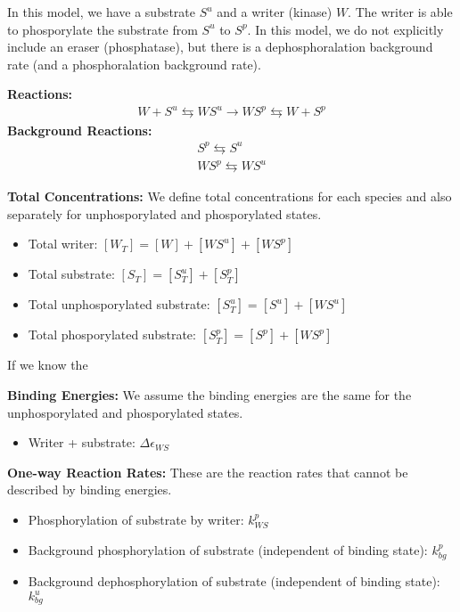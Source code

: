 \documentclass[aps,onecolumn,superscriptaddress,notitlepage]{revtex4-1}
\begin{document}
In this model, we have a substrate $S^u$ and a writer (kinase) $W$. 
The writer is able to phosporylate the substrate from $S^u$ to $S^p$.
In this model, we do not explicitly include an eraser (phosphatase), 
but there is a dephosphoralation background rate (and a phosphoralation background rate).

\textbf{Reactions:}
\begin{gather}
W + S^u \leftrightarrows WS^u \rightarrow WS^p \leftrightarrows W + S^p
\end{gather}
\textbf{Background Reactions:}
\begin{gather}
S^p \leftrightarrows S^u\\
WS^p \leftrightarrows WS^u
\end{gather}


\textbf{Total Concentrations:}
We define total concentrations for each species and also separately for unphosporylated and phosporylated states.
\begin{itemize}
\item Total writer: $[W_T] = [W] + [WS^u] + [WS^p]$
\item Total substrate: $[S_T] = [S^u_T] + [S^p_T]$
\item Total unphosporylated substrate: $[S^u_T] = [S^u] + [WS^u]$
\item Total phosporylated substrate: $[S^p_T] = [S^p] + [WS^p]$
\end{itemize}
If we know the 

\textbf{Binding Energies:}
We assume the binding energies are the same for the unphosporylated and phosporylated states.
\begin{itemize}
\item Writer + substrate: $\Delta\epsilon_{WS}$
\end{itemize}

\textbf{One-way Reaction Rates:}
These are the reaction rates that cannot be described by binding energies.
\begin{itemize}
\item Phosphorylation of substrate by writer: $k_{WS}^p$
\item Background phosphorylation of substrate (independent of binding state): $k_{bg}^p$
\item Background dephosphorylation of substrate (independent of binding state): $k_{bg}^u$
\end{itemize}
\end{document}
